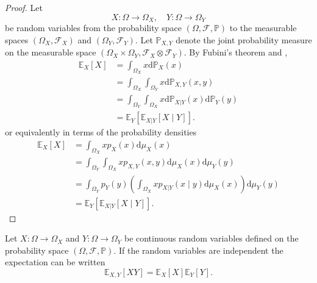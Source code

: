\begin{proof}
	Let
	\begin{equation}
		X\colon \Omega \to \Omega_X, \quad Y\colon \Omega \to \Omega_Y
	\end{equation}
	be random variables from the probability space $(\Omega, \mathcal{F}, \mathbb{P})$ to the measurable spaces $(\Omega_X, \mathcal{F}_X)$ and $(\Omega_Y, \mathcal{F}_Y)$. Let $\mathbb{P}_{X,Y}$ denote the joint probability measure on the measurable space $(\Omega_X \times \Omega_Y, \mathcal{F}_X \otimes \mathcal{F}_Y)$. By Fubini's theorem and ,
	\begin{equation}
		\begin{split}
			\mathbb{E}_X[X] 
			&= \int_{\Omega_X} x \mathrm{d}\mathbb{P}_X(x)\\
			&= \int_{\Omega_X}\int_{\Omega_Y} x \mathrm{d}\mathbb{P}_{X,Y}(x,y)\\
			&= \int_{\Omega_Y}\int_{\Omega_X} x \mathrm{d}\mathbb{P}_{X|Y}(x)\mathrm{d}\mathbb{P}_Y(y)\\
			&= \mathbb{E}_Y[\mathbb{E}_{X|Y}[X\mid Y]].
		\end{split}
	\end{equation}
	or equivalently in terms of the probability densities
	\begin{equation}
		\begin{split}
			\mathbb{E}_X[X] 
			&= \int_{\Omega_X} x p_X(x) \mathrm{d}\mu_X(x)\\
			&= \int_{\Omega_Y} \int_{\Omega_X} x p_{X,Y}(x,y) \mathrm{d}\mu_X(x) \mathrm{d}\mu_Y(y)\\
			&= \int_{\Omega_Y} p_Y(y) \left( \int_{\Omega_X} x p_{X|Y}(x\mid y) \mathrm{d}\mu_X(x) \right) \mathrm{d}\mu_Y(y)\\
			&= \mathbb{E}_Y[\mathbb{E}_{X|Y}[X\mid Y]].
		\end{split}
	\end{equation}
\end{proof}

\begin{theorem}
	\label{theorem:expectation_independent}
	Let $X\colon \Omega \to \Omega_X$ and $Y\colon \Omega \to \Omega_Y$ be continuous random variables defined on the probability space $(\Omega, \mathcal{F}, \mathbb{P})$. If the random variables are independent the expectation can be written
	\begin{equation}
		\mathbb{E}_{X,Y}[XY]=\mathbb{E}_X[X]\mathbb{E}_Y[Y].
	\end{equation}
\end{theorem}

